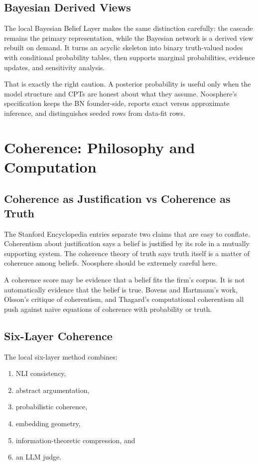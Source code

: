 \documentclass[11pt]{article}
\begin{document}
\subsection{Bayesian Derived Views}

The local Bayesian Belief Layer makes the same distinction carefully: the
cascade remains the primary representation, while the Bayesian network is a
derived view rebuilt on demand. It turns an acyclic skeleton into binary
truth-valued nodes with conditional probability tables, then supports marginal
probabilities, evidence updates, and sensitivity analysis.

That is exactly the right caution. A posterior probability is useful only when
the model structure and CPTs are honest about what they assume. Noosphere's
specification keeps the BN founder-side, reports exact versus approximate
inference, and distinguishes seeded rows from data-fit rows.

\section{Coherence: Philosophy and Computation}

\subsection{Coherence as Justification vs Coherence as Truth}

The Stanford Encyclopedia entries separate two claims that are easy to conflate.
Coherentism about justification says a belief is justified by its role in a
mutually supporting system. The coherence theory of truth says truth itself is a
matter of coherence among beliefs. Noosphere should be extremely careful here.

A coherence score may be evidence that a belief fits the firm's corpus. It is
not automatically evidence that the belief is true. Bovens and Hartmann's work,
Olsson's critique of coherentism, and Thagard's computational coherentism all
push against naive equations of coherence with probability or truth.

\subsection{Six-Layer Coherence}

The local six-layer method combines:

\begin{enumerate}
\item NLI consistency,
\item abstract argumentation,
\item probabilistic coherence,
\item embedding geometry,
\item information-theoretic compression, and
\item an LLM judge.
\end{enumerate}
\end{document}
